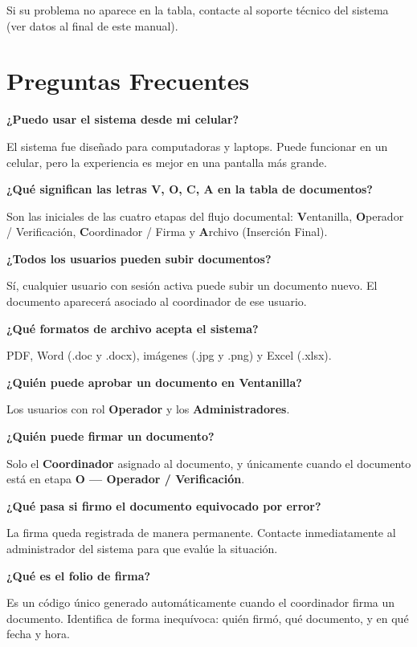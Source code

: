 \documentclass[10pt,letterpaper]{report}
\begin{document}
Si su problema no aparece en la tabla, contacte al soporte técnico del sistema (ver datos al final de este manual).

\chapter{Preguntas Frecuentes}

\textbf{¿Puedo usar el sistema desde mi celular?}

El sistema fue diseñado para computadoras y laptops. Puede funcionar en un celular, pero la experiencia es mejor en una pantalla más grande.

\textbf{¿Qué significan las letras V, O, C, A en la tabla de documentos?}

Son las iniciales de las cuatro etapas del flujo documental: \textbf{V}entanilla, \textbf{O}perador / Verificación, \textbf{C}oordinador / Firma y \textbf{A}rchivo (Inserción Final).

\textbf{¿Todos los usuarios pueden subir documentos?}

Sí, cualquier usuario con sesión activa puede subir un documento nuevo. El documento aparecerá asociado al coordinador de ese usuario.

\textbf{¿Qué formatos de archivo acepta el sistema?}

PDF, Word (.doc y .docx), imágenes (.jpg y .png) y Excel (.xlsx).

\textbf{¿Quién puede aprobar un documento en Ventanilla?}

Los usuarios con rol \textbf{Operador} y los \textbf{Administradores}.

\textbf{¿Quién puede firmar un documento?}

Solo el \textbf{Coordinador} asignado al documento, y únicamente cuando el documento está en etapa \textbf{O — Operador / Verificación}.

\textbf{¿Qué pasa si firmo el documento equivocado por error?}

La firma queda registrada de manera permanente. Contacte inmediatamente al administrador del sistema para que evalúe la situación.

\textbf{¿Qué es el folio de firma?}

Es un código único generado automáticamente cuando el coordinador firma un documento. Identifica de forma inequívoca: quién firmó, qué documento, y en qué fecha y hora.
\end{document}
